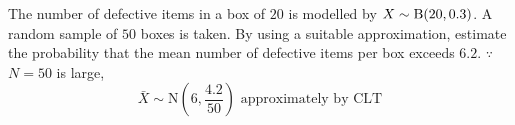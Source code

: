\par\medskip
\noindent\exlab The number of defective items in a box of $20$ is modelled by $X\sim\mathrm{B}(20,0.3)$. A random sample of $50$ boxes is taken. By using a suitable approximation, estimate the probability that the mean number of defective items per box exceeds $6.2$.
$\because$ $N=50$ is large,
\[\bar{X}\sim\mathrm{N}\!\left(6,\dfrac{4.2}{50}\right)\text{ approximately by CLT}\]
